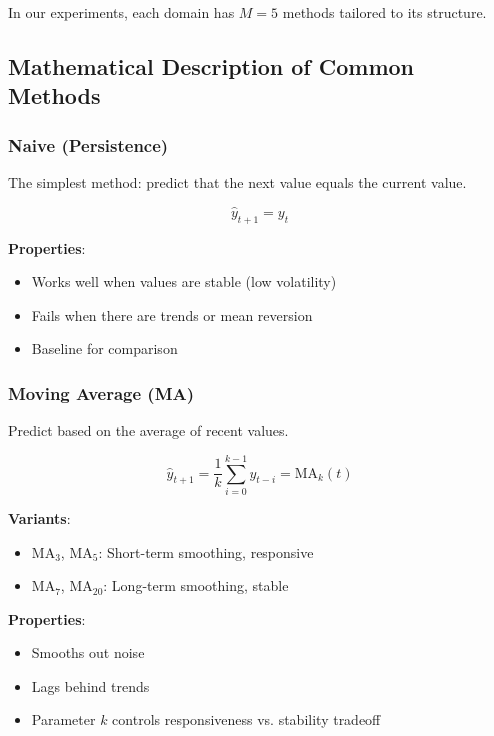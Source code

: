 \documentclass[11pt,a4paper]{article}
\theoremstyle{definition}
\theoremstyle{plain}
\begin{document}
In our experiments, each domain has $M = 5$ methods tailored to its structure.

\subsection{Mathematical Description of Common Methods}

\subsubsection{Naive (Persistence)}

The simplest method: predict that the next value equals the current value.

\begin{equation}
\hat{y}_{t+1} = y_t
\end{equation}

\textbf{Properties}:
\begin{itemize}
    \item Works well when values are stable (low volatility)
    \item Fails when there are trends or mean reversion
    \item Baseline for comparison
\end{itemize}

\subsubsection{Moving Average (MA)}

Predict based on the average of recent values.

\begin{equation}
\hat{y}_{t+1} = \frac{1}{k} \sum_{i=0}^{k-1} y_{t-i} = \text{MA}_k(t)
\end{equation}

\textbf{Variants}:
\begin{itemize}
    \item MA$_3$, MA$_5$: Short-term smoothing, responsive
    \item MA$_7$, MA$_{20}$: Long-term smoothing, stable
\end{itemize}

\textbf{Properties}:
\begin{itemize}
    \item Smooths out noise
    \item Lags behind trends
    \item Parameter $k$ controls responsiveness vs. stability tradeoff
\end{itemize}
\end{document}

